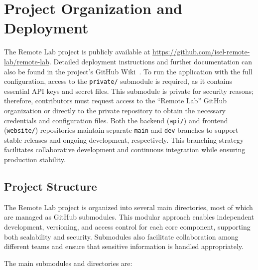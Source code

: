 \chapter{Project Organization and Deployment} \label{cap:project_org_deployment}

The Remote Lab project is publicly available at \url{https://github.com/isel-remote-lab/remote-lab}. Detailed deployment instructions and further documentation can also be found in the project's GitHub Wiki~\cite{github-wiki}. To run the application with the full configuration, access to the \texttt{private/} submodule is required, as it contains essential API keys and secret files. This submodule is private for security reasons; therefore, contributors must request access to the ``Remote Lab'' GitHub organization or directly to the private repository to obtain the necessary credentials and configuration files. Both the backend (\texttt{api/}) and frontend (\texttt{website/}) repositories maintain separate \texttt{main} and \texttt{dev} branches to support stable releases and ongoing development, respectively. This branching strategy facilitates collaborative development and continuous integration while ensuring production stability.

\section{Project Structure}

The Remote Lab project is organized into several main directories, most of which are managed as GitHub submodules. This modular approach enables independent development, versioning, and access control for each core component, supporting both scalability and security. Submodules also facilitate collaboration among different teams and ensure that sensitive information is handled appropriately.

The main submodules and directories are:

